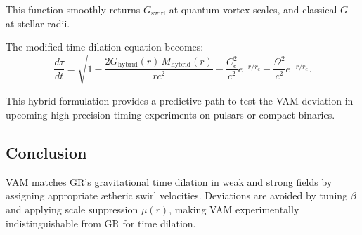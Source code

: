 This function smoothly returns $G_{\text{swirl}}$ at quantum vortex scales, and classical $G$ at stellar radii.

The modified time-dilation equation becomes:
\begin{equation}
    \frac{d\tau}{dt} = \sqrt{1 - \frac{2 G_{\text{hybrid}}(r) \, M_{\text{hybrid}}(r)}{r c^2} - \frac{C_e^2}{c^2} e^{-r/r_c} - \frac{\Omega^2}{c^2} e^{-r/r_c}}.
    \label{eq:hybrid_time_dilation}
\end{equation}

This hybrid formulation provides a predictive path to test the VAM deviation in upcoming high-precision timing experiments on pulsars or compact binaries.


\subsection*{Conclusion}
VAM matches GR's gravitational time dilation in weak and strong fields by assigning appropriate ætheric swirl velocities. Deviations are avoided by tuning $\beta$ and applying scale suppression $\mu(r)$, making VAM experimentally indistinguishable from GR for time dilation.